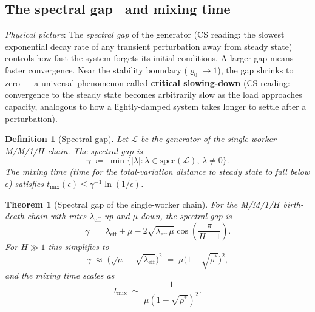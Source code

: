 \documentclass[11pt,a4paper]{article}
\newtheorem{theorem}{Theorem}[section]
\newtheorem{definition}{Definition}[section]
\newcommand{\abs}[1]{\left\lvert #1 \right\rvert}
\newcommand{\rhostar}{\rho^{*}}
\newcommand{\rhozero}{\varrho_0}
\newcommand{\generator}{\mathcal{L}}
\begin{document}
\subsection{The spectral gap~\cite{diaconis_stroock1991,fill1991} and mixing time}

\emph{Physical picture}:
The \emph{spectral gap} of the generator
(CS reading: the slowest exponential decay rate of any transient
perturbation away from steady state)
controls how fast the system forgets its initial conditions.
A larger gap means faster convergence.
Near the stability boundary ($\rhozero \to 1$), the gap shrinks to zero
--- a universal phenomenon called \textbf{critical slowing-down}
(CS reading: convergence to the steady state becomes arbitrarily slow
as the load approaches capacity, analogous to how a lightly-damped
system takes longer to settle after a perturbation).

\begin{definition}[Spectral gap]
\label{def:gap}
Let $\generator$ be the generator of the single-worker M/M/1/$H$ chain.
The \emph{spectral gap} is
\begin{equation}
  \gamma \;\coloneqq\; \min\{\abs{\lambda} : \lambda \in \mathrm{spec}(\generator),\, \lambda \neq 0\}.
  \label{eq:gap}
\end{equation}
The \emph{mixing time} (time for the total-variation distance to steady state
to fall below $\epsilon$) satisfies $t_{\mathrm{mix}}(\epsilon) \leq \gamma^{-1}\ln(1/\epsilon)$.
\end{definition}

\begin{theorem}[Spectral gap of the single-worker chain]
\label{thm:gap}
For the M/M/1/$H$ birth-death chain with rates $\lambda_{\mathrm{eff}}$ up
and $\mu$ down, the spectral gap is
\begin{equation}
  \gamma
  \;=\; \lambda_{\mathrm{eff}} + \mu
        - 2\sqrt{\lambda_{\mathrm{eff}}\,\mu}\cos\!\left(\frac{\pi}{H+1}\right).
  \label{eq:gap-exact}
\end{equation}
For $H \gg 1$ this simplifies to
\begin{equation}
  \gamma \;\approx\; \bigl(\sqrt{\mu} - \sqrt{\lambda_{\mathrm{eff}}}\bigr)^2
          \;=\; \mu\bigl(1 - \sqrt{\rhostar}\bigr)^2,
  \label{eq:gap-approx}
\end{equation}
and the mixing time scales as
\begin{equation}
  t_{\mathrm{mix}} \;\sim\; \frac{1}{\mu(1-\sqrt{\rhostar})^2}.
  \label{eq:tmix}
\end{equation}
\end{theorem}
\end{document}
